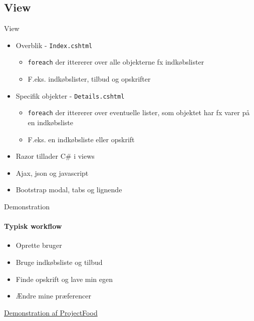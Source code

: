 \subsection{View}
\begin{frame}{View}
	\begin{itemize}
		\item Overblik - \texttt{Index.cshtml}
		\begin{itemize}
			\item \texttt{foreach} der ittererer over alle objekterne fx indkøbslister
			\item F.eks. indkøbslister, tilbud og opskrifter
		\end{itemize}
		\item Specifik objekter - \texttt{Details.cshtml}
		\begin{itemize}
			\item \texttt{foreach} der ittererer over eventuelle lister, som objektet har fx varer på en indkøbsliste
			\item F.eks. en indkøbsliste eller opskrift
		\end{itemize}
		\item Razor tillader C\# i views
		\item Ajax, json og javascript
		\item Bootstrap modal, tabs og lignende
	\end{itemize}
\end{frame}

\begin{frame}{Demonstration}
	\framesubtitle{Typisk workflow}
	\begin{itemize}
	\item Oprette bruger
	\item Bruge indkøbsliste og tilbud
	\item Finde opskrift og lave min egen
	\item Ændre mine præferencer
	\end{itemize}
	\href{http://james:8080}{Demonstration af ProjectFood}
\end{frame}